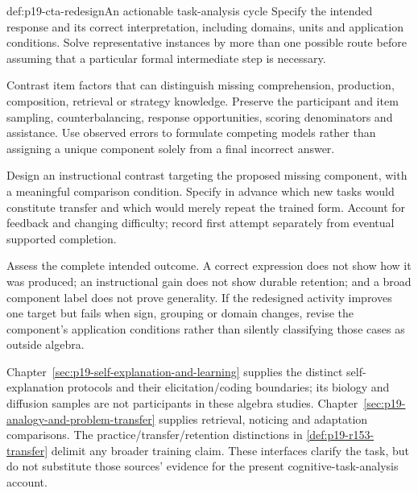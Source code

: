 \begin{hbmethod}{def:p19-cta-redesign}{An actionable task-analysis cycle}
Specify the intended response and its correct interpretation, including
domains, units and application conditions. Solve representative
instances by more than one possible route before assuming that a
particular formal intermediate step is necessary.

Contrast item factors that can distinguish missing comprehension,
production, composition, retrieval or strategy knowledge. Preserve
the participant and item sampling, counterbalancing, response
opportunities, scoring denominators and assistance. Use observed
errors to formulate competing models rather than assigning a unique
component solely from a final incorrect answer.

Design an instructional contrast targeting the proposed missing
component, with a meaningful comparison condition. Specify in advance
which new tasks would constitute transfer and which would merely
repeat the trained form. Account for feedback and changing difficulty;
record first attempt separately from eventual supported completion.

Assess the complete intended outcome. A correct expression does
not show how it was produced; an instructional gain does not show
durable retention; and a broad component label does not prove
generality. If the redesigned activity improves one target but fails
when sign, grouping or domain changes, revise the component's
application conditions rather than silently classifying those cases
as outside algebra.
\end{hbmethod}

Chapter~\ref{sec:p19-self-explanation-and-learning} supplies the
distinct self-explanation protocols and their elicitation/coding
boundaries; its biology and diffusion samples are not participants
in these algebra studies. Chapter~\ref{sec:p19-analogy-and-problem-transfer}
supplies retrieval, noticing and adaptation comparisons. The
practice/transfer/retention distinctions in
\cref{def:p19-r153-transfer} delimit any broader training claim.
These interfaces clarify the task, but do not substitute those
sources' evidence for the present cognitive-task-analysis account.
